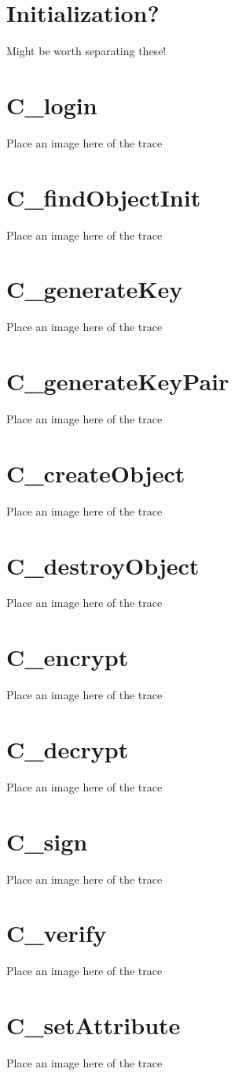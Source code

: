 \documentclass[bsc,frontabs,twoside,singlespacing,parskip,deptreport]{infthesis}     %
\begin{document}
\section{Initialization?}
Might be worth separating these!
\section{C\_login}
Place an image here of the trace
\section{C\_findObjectInit}
Place an image here of the trace
\section{C\_generateKey}
Place an image here of the trace
\section{C\_generateKeyPair}
Place an image here of the trace
\section{C\_createObject}
Place an image here of the trace
\section{C\_destroyObject}
Place an image here of the trace
\section{C\_encrypt}
Place an image here of the trace
\section{C\_decrypt}
Place an image here of the trace
\section{C\_sign}
Place an image here of the trace
\section{C\_verify}
Place an image here of the trace
\section{C\_setAttribute}
Place an image here of the trace
\end{document}
